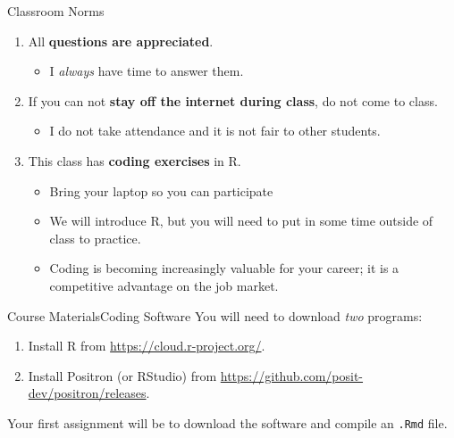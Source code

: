 \documentclass[aspectratio=169,t,11pt,table]{beamer}
\begin{document}
\begin{frame}{Classroom Norms}
  \begin{enumerate}
    \item All \alert{\bf questions are appreciated}. 
    \begin{itemize}
      \item I \emph{always} have time to answer them.
    \end{itemize}

    \item If you can not \alert{\bf stay off the internet during class}, do not come to class. 
    \begin{itemize}
      \item I do not take attendance and it is not fair to other students.
    \end{itemize}
    
    \item This class has \alert{\bf coding exercises} in R. 
    \begin{itemize}
      \item Bring your laptop so you can participate
      
      \item We will introduce R, but you will need to put in some time outside of class to practice. 
      
      \item Coding is becoming increasingly valuable for your career; it is a competitive advantage on the job market.
    \end{itemize}
  \end{enumerate}
\end{frame}

\begin{frame}{Course Materials}{Coding Software}
  You will need to download \emph{two} programs:
  \begin{enumerate}
    \item Install R from \url{https://cloud.r-project.org/}.
    \item Install Positron (or RStudio) from \url{https://github.com/posit-dev/positron/releases}. 
  \end{enumerate}

  \bigskip
  Your first assignment will be to download the software and compile an \texttt{.Rmd} file.
\end{frame}
\end{document}
